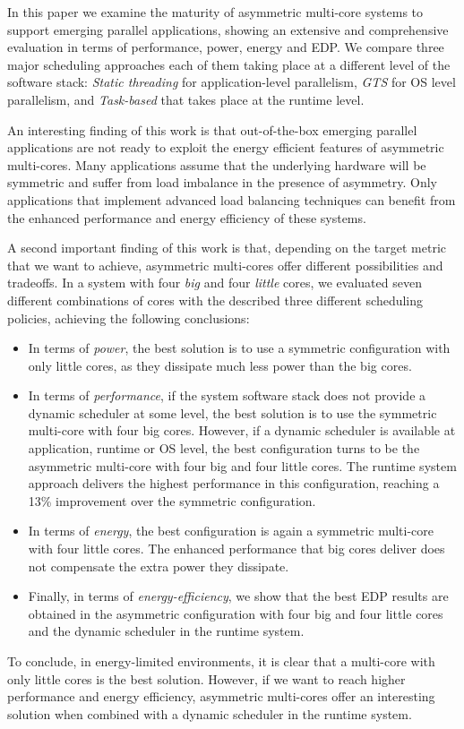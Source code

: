 In this paper we examine the maturity of asymmetric multi-core systems to support emerging parallel applications, showing an extensive and comprehensive evaluation in terms of performance, power, energy and EDP. We compare three major scheduling approaches each of them taking place at a different level of the software stack: \emph{Static threading} for application-level parallelism, \emph{GTS} for OS level parallelism, and \emph{Task-based} that takes place at the runtime level.


An interesting finding of this work is that out-of-the-box emerging parallel applications are not ready to exploit the energy efficient features of asymmetric multi-cores. Many applications assume that the underlying hardware will be symmetric and suffer from load imbalance in the presence of asymmetry. Only applications that implement advanced load balancing techniques can benefit from the enhanced performance and energy efficiency of these systems.

A second important finding of this work is that, depending on the target metric that we want to achieve, asymmetric multi-cores offer different possibilities and tradeoffs. In a system with four \emph{big} and four \emph{little} cores, we evaluated seven different combinations of cores with the described three different scheduling policies, achieving the following conclusions:
\begin{itemize}
 \item In terms of \emph{power}, the best solution is to use a symmetric configuration with only little cores, as they dissipate much less power than the big cores.
 \item In terms of \emph{performance}, if the system software stack does not provide a dynamic scheduler at some level, the best solution is to use the symmetric multi-core with four big cores. However, if a dynamic scheduler is available at application, runtime or OS level, the best configuration turns to be the asymmetric multi-core with four big and four little cores. The runtime system approach delivers the highest performance in this configuration, reaching a 13\% improvement over the symmetric configuration.
 \item In terms of \emph{energy}, the best configuration is again a symmetric multi-core with four little cores. The enhanced performance that big cores deliver does not compensate the extra power they dissipate.
 \item Finally, in terms of \emph{energy-efficiency}, we show that the best EDP results are obtained in the asymmetric configuration with four big and four little cores and the dynamic scheduler in the runtime system.
\end{itemize}
To conclude, in energy-limited environments, it is clear that a multi-core with only little cores is the best solution. However, if we want to reach higher performance and energy efficiency, asymmetric multi-cores offer an interesting solution when combined with a dynamic scheduler in the runtime system.


